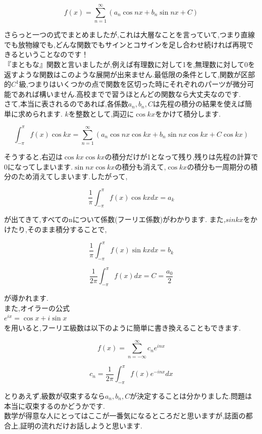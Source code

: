 \[
  f(x) = \sum_{n=1}^\infty (a_n \cos nx + b_n \sin nx + C)
\]

さらっと一つの式でまとめましたが,これは大層なことを言っていて,つまり直線でも放物線でも,どんな関数でもサインとコサインを足し合わせ続ければ再現できるということなのです！\\
『まともな』関数と言いましたが,例えば有理数に対して1を,無理数に対して0を返すような関数はこのような展開が出来ません.最低限の条件として,関数が区部的$C^1$級,つまりはいくつかの点で関数を区切った時にそれぞれのパーツが微分可能であれば構いません.高校までで習うほとんどの関数なら大丈夫なのです.\\

さて,本当に表されるのであれば,各係数$a_n,b_n,C$は先程の積分の結果を使えば簡単に求められます.
$k$を整数として,両辺に$\cos kx$をかけて積分します.

\[
  \int_{-\pi}^\pi f(x) \cos kx = \sum_{n=1}^\infty (a_n \cos nx \cos kx+ b_n \sin nx \cos kx + C \cos kx)
\]

そうすると,右辺は$\cos kx \cos kx$の積分だけが1となって残り,残りは先程の計算で0になってしまいます.$\sin nx \cos kx$の積分も消えて,$\cos kx$の積分も一周期分の積分のため消えてしまいます.したがって,

\[
  \frac{1}{\pi} \int_{-\pi}^\pi f(x) \cos kx dx = a_k
\]

が出てきて,すべてのnについて係数(フーリエ係数)がわかります.
また,$sin kx$をかけたり,そのまま積分することで,

\[
  \frac{1}{\pi} \int_{-\pi}^\pi f(x) \sin kx dx = b_k
\]

\[
  \frac{1}{2 \pi} \int_{-\pi}^\pi f(x) dx = C = \frac{a_0}{2}
\]

が導かれます.\\
また,オイラーの公式\\
$e^{ix} = \cos x + i \sin x$\\
を用いると,フーリエ級数は以下のように簡単に書き換えることもできます.

\[
  f(x) = \sum_{n=-\infty}^\infty c_n e^{inx}
\]

\[
  c_n = \frac{1}{2\pi} \int_{-\pi}^\pi f(x) e^{-inx} dx
\]

とりあえず,級数が収束するなら$a_n,b_n,C$が決定することは分かりました.問題は本当に収束するのかどうかです.\\
数学が得意な人にとってはここが一番気になるところだと思いますが,誌面の都合上,証明の流れだけお話しようと思います.\\


